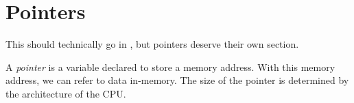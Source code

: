 \section{Pointers}\label{sec:Pointers}
This should technically go in , but pointers deserve their own section.

\begin{definition}[Pointer]\label{def:Pointer}
A \emph{pointer} is a variable declared to store a memory address.
With this memory address, we can refer to data in-memory.
The size of the pointer is determined by the architecture of the CPU.\@
\end{definition}


